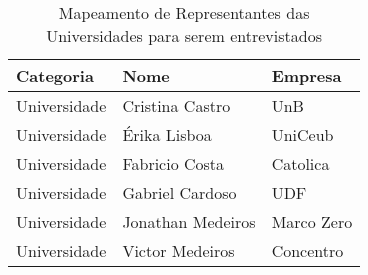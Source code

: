 \begin{apendicesenv}
\begin{table}[!htb]
	\centering
	\begin{tabular}{ | p{3cm} | p{8cm} | p{4cm} | }
		\hline
		Categoria & Nome & Empresa \\ \hline
		Universidade & Cristina Castro & UnB \\ \hline
		Universidade & Érika Lisboa & UniCeub \\ \hline
		Universidade & Fabricio Costa & Catolica \\ \hline
		Universidade & Gabriel Cardoso & UDF \\ \hline
		Universidade & Jonathan Medeiros & Marco Zero \\ \hline		
		Universidade & Victor Medeiros & Concentro \\ \hline
	\end{tabular}
	\caption{Mapeamento de Representantes das Universidades para serem entrevistados}
	\label{table:sugestao_de_universidades_para_entrevista}
\end{table}

\end{apendicesenv}
